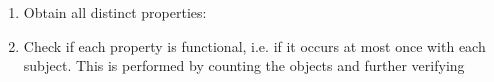 \begin{enumerate}[leftmargin=0cm]
																																																																																																																																																																																																																																																																																																																																																																																																																																																																																																																																																																																							\item Obtain all distinct properties:\\
																																																																																																																																																																																																																																																																																																																																																																																																																																																																																																																																																																																										\item Check if each property is functional, i.e. if it
																																																																																																																																																																																																																																																																																																																																																																																																																																																																																																																																																																																												occurs at most once with each subject.
																																																																																																																																																																																																																																																																																																																																																																																																																																																																																																																																																																																														This is performed by counting the objects and further verifying

\end{enumerate}
